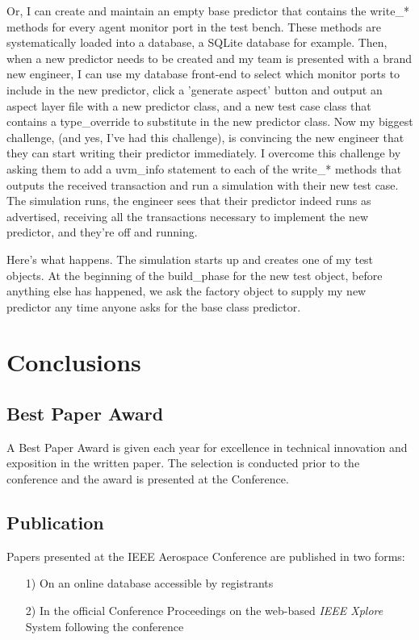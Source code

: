 \documentclass[twocolumn,letterpaper]{IEEEAerospaceCLS}  %
\begin{document}
Or, I can create and maintain an empty base predictor that contains the write\_* methods for every agent monitor port in the test bench. These methods are systematically loaded into a database, a SQLite database for example. Then, when a new predictor needs to be created and my team is presented with a brand new engineer, I can use my database front-end to select which monitor ports to include in the new predictor, click a 'generate aspect' button and output an aspect layer file with a new predictor class, and a new test case class that contains a type\_override to substitute in the new predictor class. Now my biggest challenge, (and yes, I've had this challenge), is convincing the new engineer that they can start writing their predictor immediately. I overcome this challenge by asking them to add a uvm\_info statement to each of the write\_* methods that outputs the received transaction and run a simulation with their new test case. The simulation runs, the engineer sees that their predictor indeed runs as advertised, receiving all the transactions necessary to implement the new predictor, and they're off and running.

Here's what happens. The simulation starts up and creates one of my test objects. At the beginning of the build\_phase for the new test object, before anything else has happened, we ask the factory object to supply my new predictor any time anyone asks for the base class predictor.


\section{Conclusions}
\subsection{Best Paper Award}
A Best Paper Award is given each year for excellence in technical innovation and exposition in the written paper. The selection is conducted prior to the conference and the award is presented at the Conference.

\subsection{Publication}
Papers presented at the IEEE Aerospace Conference are published in two forms:
\begin{itemize}
  \item [1)] On an online database accessible by registrants \\
  \item [2)] In the official Conference Proceedings on the web-based {\it{IEEE Xplore}} System following the conference
\end{itemize}
\end{document}
